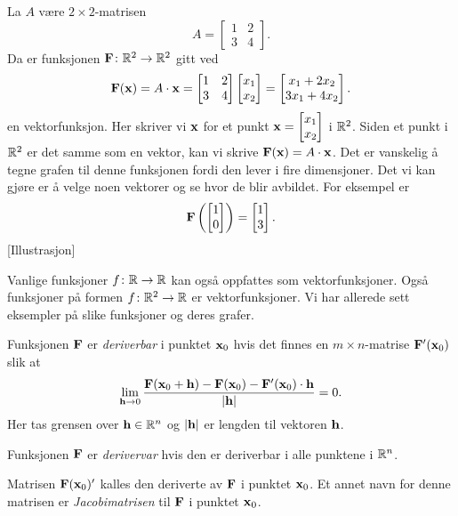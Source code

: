 \begin{eksempel}
  La $A$ være $2 \times 2$-matrisen
  $$A = \begin{bmatrix} 1 & 2 \\ 3 & 4 \end{bmatrix}.$$
  Da er funksjonen $\mathbf{F} \colon \mathbb{R}^2 \to \mathbb{R}^2$ gitt ved
  $$\mathbf{F}(\mathbf{x}) = A \cdot \mathbf{x} = \begin{bmatrix} 1 & 2 \\ 3 & 4 \end{bmatrix}
  \begin{bmatrix} x_1 \\ x_2 \end{bmatrix} = \begin{bmatrix} x_1 + 2x_2 \\ 3x_1
  + 4x_2 \end{bmatrix}.$$
  en vektorfunksjon.
  Her skriver vi $\mathbf{x}$ for et punkt $\mathbf{x} = \begin{bmatrix} x_1 \\ x_2 \end{bmatrix}$ i $\mathbb{R}^2$. 
  Siden et punkt i $\mathbb{R}^2$ er det samme som en vektor, kan vi skrive $\mathbf{F}(\mathbf{x}) = A \cdot \mathbf{x}$.
  Det er vanskelig å tegne grafen til denne funksjonen fordi den lever i fire dimensjoner. Det vi kan gjøre
  er å velge noen vektorer og se hvor de blir avbildet. For eksempel er
  $$\mathbf{F}\left(\begin{bmatrix} 1 \\ 0 \end{bmatrix}\right) = \begin{bmatrix} 1 \\ 3 \end{bmatrix}.$$
  [Illustrasjon]
\end{eksempel}
\begin{eksempel}
  Vanlige funksjoner $f \colon \mathbb{R} \to \mathbb{R}$ kan også oppfattes som vektorfunksjoner. Også funksjoner på formen
  $f \colon \mathbb{R}^2 \to \mathbb{R}$ er vektorfunksjoner. Vi har allerede sett eksempler på slike funksjoner og deres grafer.
\end{eksempel}
\begin{definisjon}
  Funksjonen $\mathbf{F}$ er {\em deriverbar} i punktet $\mathbf{x}_0$ hvis det finnes en $m \times n$-matrise $\mathbf{F}'(\mathbf{x}_0)$ slik at
$$\lim_{\mathbf{h}\to 0} \frac{\mathbf{F}(\mathbf{x}_0+\mathbf{h}) - \mathbf{F}(\mathbf{x}_0) -
\mathbf{F}'(\mathbf{x}_0) \cdot \mathbf{h}}{|\mathbf{h}|} = 0.$$
Her tas grensen over $\mathbf{h} \in \mathbb{R}^n$ og $| \mathbf{h}|$ er lengden til vektoren $\mathbf{h}$.

Funksjonen $\mathbf{F}$ er {\em derivervar} hvis den er deriverbar i alle punktene i
$\mathbb{R}^n$.

Matrisen $\mathbf{F}(\mathbf{x}_0)'$ kalles den deriverte av $\mathbf{F}$ i punktet $\mathbf{x}_0$. Et annet
navn for denne matrisen er {\em Jacobimatrisen} til $\mathbf{F}$ i punktet $\mathbf{x}_0$.
\end{definisjon}


